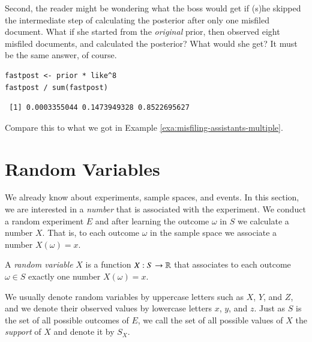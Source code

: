 \documentclass[captions=tableheading]{scrbook}
\begin{document}
Second, the reader might be wondering what the boss would get if (s)he skipped the intermediate step of calculating the posterior after only one misfiled document. What if she started from the \emph{original} prior, then observed eight misfiled documents, and calculated the posterior? What would she get? It must be the same answer, of course.


\begin{verbatim}
fastpost <- prior * like^8
fastpost / sum(fastpost)
\end{verbatim}

\begin{verbatim}
 [1] 0.0003355044 0.1473949328 0.8522695627
\end{verbatim}

Compare this to what we got in Example \ref{exa:misfiling-assistants-multiple}.
\section{Random Variables}
\label{sec-3-9}

\label{sec:Random-Variables}

We already know about experiments, sample spaces, and events. In this section, we are interested in a \emph{number} that is associated with the experiment. We conduct a random experiment \(E\) and after learning the outcome \(\omega\) in \(S\) we calculate a number \(X\). That is, to each outcome \(\omega\) in the sample space we associate a number \(X(\omega)=x\). 

\begin{defn}
A \emph{random variable} \(X\) is a function \(X:S\to\mathbb{R}\) that associates to each outcome \(\omega\in S\) exactly one number \(X(\omega)=x\). 
\end{defn}

We usually denote random variables by uppercase letters such as \(X\), \(Y\), and \(Z\), and we denote their observed values by lowercase letters \(x\), \(y\), and \(z\). Just as \(S\) is the set of all possible outcomes of \(E\), we call the set of all possible values of \(X\) the \emph{support} of \(X\) and denote it by \(S_{X}\).
\end{document}
